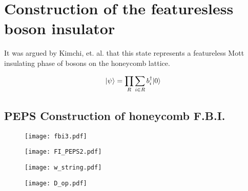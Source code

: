 
\section{Construction of the featuresless boson insulator}

It was argued by Kimchi, et. al. \cite{kimchi2013} that this state represents a featureless Mott insulating phase of bosons on the honeycomb lattice.

\begin{equation}
\vert \psi \rangle = \prod\limits_{R} \sum\limits_{i \in R} b^{\dagger}_{i} \vert 0 \rangle
\label{eq:def}
\end{equation}


\subsection{PEPS Construction of honeycomb F.B.I.}
\begin{figure}[H]
	\centering
	\texttt{[image: fbi3.pdf]}
\end{figure}

\begin{figure}[H]
	\centering
	\texttt{[image: FI\_PEPS2.pdf]}
\end{figure}

\begin{figure}[H]
	\centering
	\texttt{[image: w\_string.pdf]}
\end{figure}

\begin{figure}[H]
	\centering
	\texttt{[image: D\_op.pdf]}
\end{figure}
